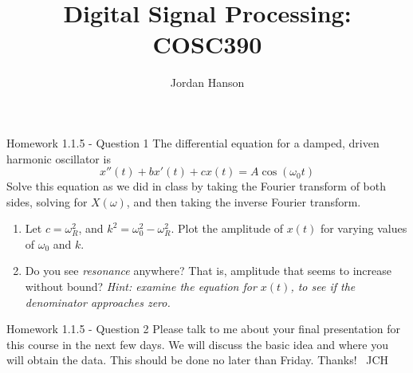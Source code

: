 \documentclass{beamer}
\title{Digital Signal Processing: COSC390}
\author{Jordan Hanson}
\institute{Whittier College Department of Physics and Astronomy}
\begin{document}
\maketitle

\begin{frame}{Homework 1.1.5 - Question 1}
\small
The differential equation for a damped, driven harmonic oscillator is 
\begin{equation}
\boxed{
x''(t) +bx'(t) + c x(t) = A\cos(\omega_0 t)
}
\end{equation}
Solve this equation as we did in class by taking the Fourier transform of both sides, solving for $X(\omega)$, and then taking the inverse Fourier transform.
\begin{enumerate}
\item Let $c = \omega_R^2$, and $k^2 = \omega_0^2 - \omega_R^2$. Plot the amplitude of $x(t)$ for varying values of $\omega_0$ and $k$.
\item Do you see \textit{resonance} anywhere?  That is, amplitude that seems to increase without bound? \textit{Hint: examine the equation for $x(t)$, to see if the denominator approaches zero.}
\end{enumerate}
\end{frame}

\begin{frame}{Homework 1.1.5 - Question 2}
Please talk to me about your final presentation for this course in the next few days.  We will discuss the basic idea and where you will obtain the data.  This should be done no later than Friday.  Thanks! ~JCH
\end{frame}
\end{document}
